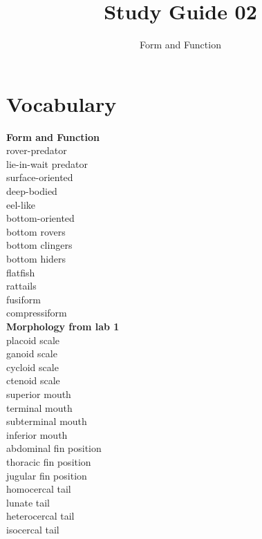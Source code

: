 \documentclass[nofonts, letterpaper]{tufte-handout}
\title{Study Guide 02}
\author{Form and Function}
\date{} %
\begin{document}
\maketitle	%


\section{Vocabulary} 
\vspace{-1\baselineskip}
\begin{multicols}{2}
\textbf{Form and Function} \\
rover-predator \\
lie-in-wait predator \\
surface-oriented \\
deep-bodied \\
eel-like \\
bottom-oriented \\
bottom rovers \\
bottom clingers \\
bottom hiders \\
flatfish \\
rattails \\
fusiform \\
compressiform  \\
\columnbreak\textbf{Morphology from lab 1} \\
placoid scale \\
ganoid scale \\
cycloid scale \\
ctenoid scale \\
superior mouth  \\
terminal mouth  \\
subterminal mouth  \\
inferior mouth  \\
abdominal fin position \\
thoracic fin position \\
jugular fin position \\
homocercal tail \\
lunate tail \\
heterocercal tail \\
isocercal tail \\
\end{multicols}
\end{document}
